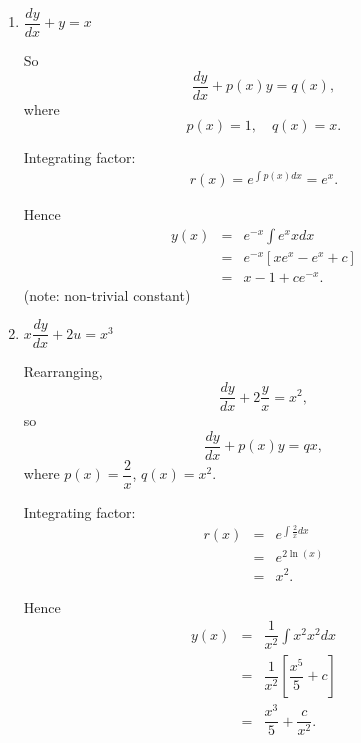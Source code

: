 \begin{examples}
\quad

\begin{enumerate}
 \item $\dfrac{dy}{dx} + y  =  x$

 So
 \[
  \dfrac{dy}{dx} + p(x)y = q(x),
 \]
where
\[
p(x) = 1, \quad q(x) = x.
\]

Integrating factor:
\begin{eqnarray*}
r(x) = e^{\int p(x)dx}
 =  e^x.
 \end{eqnarray*}
 
Hence
\begin{eqnarray*}
y(x) &=&  e^{-x} \int e^x x dx\\
&=&  e^{-x} [xe^{x} - e^{x} + c]\\
&=&  x - 1 + ce^{-x}.
\end{eqnarray*}
(note: non-trivial constant)

\item $x \dfrac{dy}{dx} + 2 u  =  x^3$

Rearranging,
\[
 \frac{dy}{dx} + 2 \frac{y}{x}  =  x^2 ,
\]
so
\[
 \frac{dy}{dx} + p(x)y  =  q{x}, 
\]
where $p(x)=\dfrac{2}{x}$, $q(x) = x^2$.

Integrating factor:
\begin{eqnarray*}
 r(x) &=& e^{\int \frac{2}{x}dx} \\
 &=& e^{2\ln(x)}\\
 &=& x^2.
\end{eqnarray*}

Hence
\begin{eqnarray*}
 y(x) &=& \dfrac{1}{x^2} \int x^2 x^2 dx \\
 &=& \dfrac{1}{x^2} \left[\dfrac{x^5}{5}+c\right]\\
 &=& \dfrac{x^3}{5} + \dfrac{c}{x^2}.
\end{eqnarray*}



\end{enumerate}
\end{examples}
